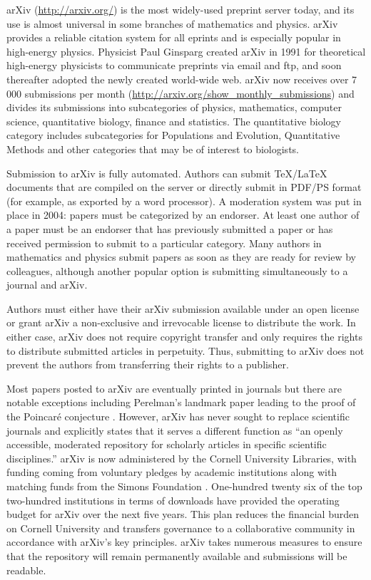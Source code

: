 \documentclass[letterpaper,twocolumn,superscriptaddress,showkeys,longbibliography]{revtex4-1}
\begin{document}
arXiv (\url{http://arxiv.org/}) is the most widely-used preprint server today,
and its use is almost universal in some branches of mathematics and physics.
arXiv provides a reliable citation system for all eprints and is especially
popular in high-energy physics. Physicist Paul Ginsparg created arXiv in 1991
for theoretical high-energy physicists to communicate preprints via email and
ftp, and soon thereafter adopted the newly created world-wide
web\cite{jackson2002preprints}.  arXiv now receives over 7 000 submissions per
month (\url{http://arxiv.org/show_monthly_submissions}) and divides its
submissions into subcategories of physics, mathematics, computer science,
quantitative biology, finance and statistics.  The quantitative biology category
includes subcategories for Populations and Evolution, Quantitative Methods and
other categories that may be of interest to biologists.

Submission to arXiv is fully automated.  Authors can submit \TeX{}/\LaTeX{}
documents that are compiled on the server or directly submit in PDF/PS format
(for example, as exported by a word processor).  A moderation system was put in
place in 2004: papers must be categorized by an endorser. At least one author of
a paper must be an endorser that has previously submitted a paper or has
received permission to submit to a particular category.  Many authors in
mathematics and physics submit papers as soon as they are ready for review by
colleagues, although another popular option is submitting simultaneously to a
journal and arXiv.

Authors must either have their arXiv submission available under an open license
or grant arXiv a non-exclusive and irrevocable license to distribute the work.
In either case, arXiv does not require copyright transfer and only requires the
rights to distribute submitted articles in perpetuity. Thus, submitting to arXiv
does not prevent the authors from transferring their rights to a
publisher.

Most papers posted to arXiv are eventually printed in journals but there are
notable exceptions including Perelman's landmark paper leading to the proof of
the Poincar\'{e} conjecture \cite{2002math.....11159P}.  However, arXiv has
never sought to replace scientific journals and explicitly states that it serves
a different function as ``an openly accessible, moderated repository for
scholarly articles in specific scientific disciplines.'' arXiv is now
administered by the Cornell University Libraries, with funding coming from
voluntary pledges by academic institutions along with matching funds from the
Simons Foundation \cite{arxiv_future}.  One-hundred twenty six of the top
two-hundred institutions in terms of downloads have provided the operating
budget for arXiv over the next five years.  This plan reduces the financial
burden on Cornell University and transfers governance to a collaborative
community in accordance with arXiv's key principles.  arXiv takes numerous
measures to ensure that the repository will remain permanently available and
submissions will be readable.
\end{document}
